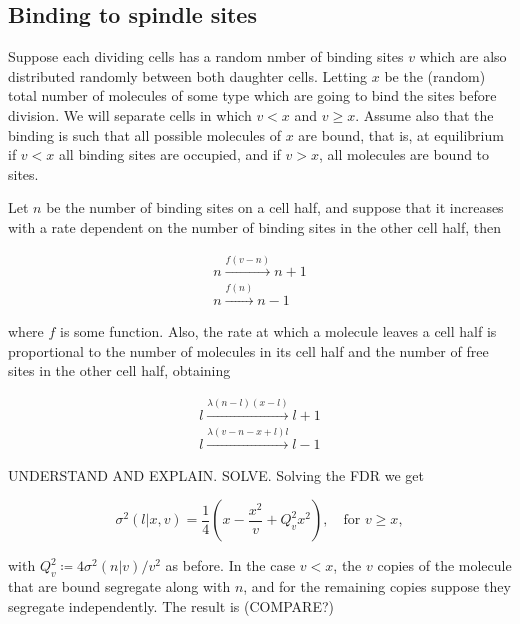 \subsection{Binding to spindle sites}

Suppose each dividing cells has a random nmber of binding sites $v$ which are also distributed randomly between both daughter cells. Letting $x$ be the (random) total number of molecules of some type which are going to bind the sites before division. We will separate cells in which $v<x$ and $v\geq x$. Assume also that the binding is such that all possible molecules of $x$ are bound, that is, at equilibrium if $v<x$ all binding sites are occupied, and if $v>x$, all molecules are bound to sites.

Let $n$ be the number of binding sites on a cell half, and suppose that it increases with a rate dependent on the number of binding sites in the other cell half, then

\begin{equation}
  \begin{split}
    n\xrightarrow{f(v-n)}n+1\\
    n\xrightarrow{f(n)}n-1
  \end{split}
\end{equation}

where $f$ is some function. Also, the rate at which a molecule leaves a cell half is proportional to the number of molecules in its cell half and the number of free sites in the other cell half, obtaining

\begin{equation}
  \begin{split}
    l\xrightarrow{\lambda(n-l)(x-l)}l+1\\
    l\xrightarrow{\lambda(v-n-x+l)l}l-1
  \end{split}
\end{equation}

UNDERSTAND AND EXPLAIN. SOLVE. Solving the FDR we get

\begin{equation}
  \sigma^2(l|x,v) =\frac{1}{4}\left(x-\frac{x^2}{v}+Q_v^2x^2\right),\quad \text{for } v\geq x,
\end{equation}

with $Q_v^2 \coloneqq 4\sigma^2(n|v)/v^2$ as before. In the case $v<x$, the $v$ copies of the molecule that are bound segregate along with $n$, and for the remaining copies suppose they segregate independently. The result is (COMPARE?)

